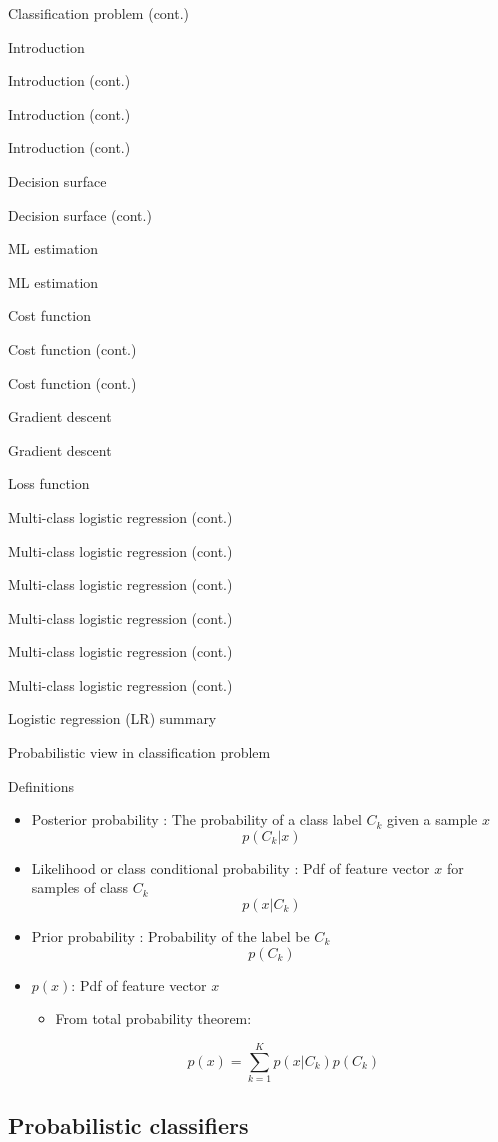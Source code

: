 \documentclass[serif, aspectratio=169]{beamer}
\begin{document}
\begin{frame}{Classification problem (cont.)}
\begin{itemize}
\begin{frame}{Introduction}
\begin{itemize}
\begin{frame}{Introduction (cont.)}
\begin{frame}{Introduction (cont.)}
\begin{frame}{Introduction (cont.)}
\begin{frame}{Decision surface}
\begin{itemize}
\begin{frame}{Decision surface (cont.)}
\begin{frame}{ML estimation}
\begin{frame}{ML estimation}
\begin{itemize}
\begin{frame}{Cost function}
\begin{frame}{Cost function (cont.)}
\begin{itemize}
\begin{itemize}
\begin{frame}{Cost function (cont.)}
\begin{frame}{Gradient descent}
\begin{frame}{Gradient descent}
\begin{frame}{Loss function}
\begin{frame}{Multi-class logistic regression (cont.)}
\begin{frame}{Multi-class logistic regression (cont.)}
\begin{frame}{Multi-class logistic regression (cont.)}
\begin{frame}{Multi-class logistic regression (cont.)}
\begin{frame}{Multi-class logistic regression (cont.)}
\begin{frame}{Multi-class logistic regression (cont.)}
\begin{frame}{Logistic regression (LR) summary}
\begin{itemize}
\begin{frame}{Probabilistic view in classification problem}
\begin{itemize}
    \end{itemize}
\end{frame}
\begin{frame}{Definitions}
    \begin{itemize}
        \item Posterior probability : The probability of a class label $C_k$ given a sample $x$
            \[
                p(C_k|x)
            \]
            
        \item Likelihood or class conditional probability : Pdf of feature vector $x$ for samples of class $C_k$
            \[
                 p(x|C_k)
            \]
        
        \item Prior probability : Probability of the label be $C_k$ 
            \[
                p(C_k)
            \]
            
        \item $p(x)$: Pdf of feature vector $x$ 
            \begin{itemize}
                \item From total probability theorem:   
                
                \[ p(x)=\sum_{k=1}^{K}p(x|C_k)p(C_k)
                \]
            \end{itemize}
        
    \end{itemize}
\end{frame}



\subsection{Probabilistic classifiers}


\end{itemize}
\end{frame}
\end{frame}
\end{frame}
\end{frame}
\end{frame}
\end{frame}
\end{frame}
\end{frame}
\end{frame}
\end{frame}
\end{frame}
\end{itemize}
\end{itemize}
\end{frame}
\end{frame}
\end{itemize}
\end{frame}
\end{frame}
\end{frame}
\end{itemize}
\end{frame}
\end{frame}
\end{frame}
\end{frame}
\end{itemize}
\end{frame}
\end{itemize}
\end{frame}
\end{document}
